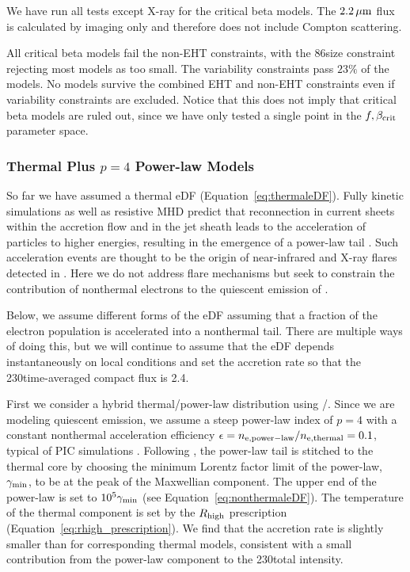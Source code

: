 We have run all tests except X-ray for the critical beta models.
The $2.2\,\mu\mathrm{m}$ flux is calculated by imaging only and therefore does not include Compton scattering.

All critical beta models fail the non-EHT constraints, with the 86\GHz size constraint rejecting most models as too small.
The variability constraints pass $23\%$ of the models.
No models survive the combined EHT and non-EHT constraints even if variability constraints are excluded.
Notice that this does not imply that critical beta models are ruled out, since we have only tested a single point in the $f,\beta_{\rm crit}$ parameter space.

\subsubsection{Thermal Plus \texorpdfstring{$p = 4$}{p=4} Power-law Models}

So far we have assumed a thermal eDF (Equation~\ref{eq:thermaleDF}).
Fully kinetic simulations as well as resistive MHD predict that reconnection in current sheets within the accretion flow and in the jet sheath leads to the acceleration of particles to higher energies, resulting in the emergence of a power-law tail  \citep[e.g.,][and references therein]{Sironi2021}.
Such acceleration events are thought to be the origin of near-infrared and X-ray flares detected in \sgra.
Here we do not address flare mechanisms but seek to constrain the contribution of nonthermal electrons to the quiescent emission of \sgra.

Below, we assume different forms of the eDF assuming that a fraction of the electron population is accelerated into a nonthermal tail.
There are multiple ways of doing this, but we will continue to assume that the eDF depends instantaneously on local conditions and set the accretion rate so that the 230\GHz time-averaged compact flux is 2.4\Jy.

First we consider a hybrid thermal/power-law distribution using \hamr/\bhoss.
Since we are modeling quiescent emission, we assume a steep power-law index of $p=4$ with a constant nonthermal acceleration efficiency $\epsilon=n_{\rm e, power-law}/n_{\rm e, thermal}=0.1$, typical of PIC simulations \citep[e.g.,][]{Sironi2015,Crumley2019}.
Following \citet{Chatterjee2021}, the power-law tail is stitched to the thermal core by choosing the minimum Lorentz factor limit of the power-law, $\gamma_{\rm min}$, to be at the peak of the Maxwellian component.
The upper end of the power-law is set to $10^5 \gamma_{\rm min}$ (see Equation~\ref{eq:nonthermaleDF}).
The temperature of the thermal component is set by the $R_\mathrm{high}$ prescription (Equation~\ref{eq:rhigh_prescription}).
We find that the accretion rate is slightly smaller than for corresponding thermal models, consistent with a small contribution from the power-law component to the 230\GHz total intensity.

